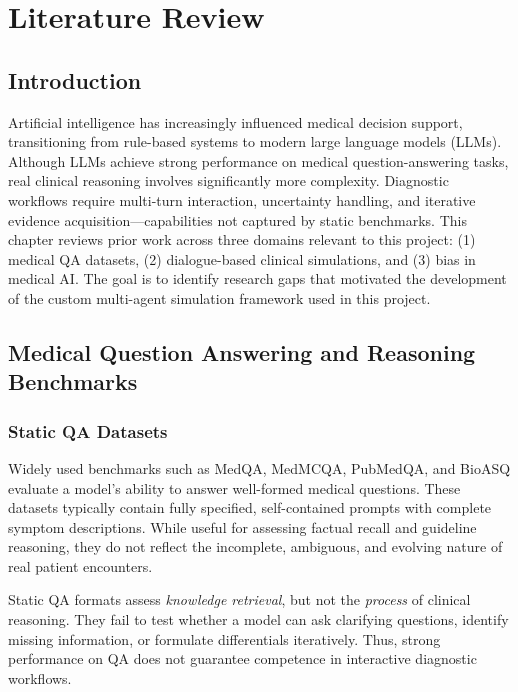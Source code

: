 
\chapter{Literature Review}

\label{Chapter 2} 


\section{Introduction}

Artificial intelligence has increasingly influenced medical decision support, transitioning from rule-based systems to modern large language models (LLMs). Although LLMs achieve strong performance on medical question-answering tasks, real clinical reasoning involves significantly more complexity. Diagnostic workflows require multi-turn interaction, uncertainty handling, and iterative evidence acquisition—capabilities not captured by static benchmarks.  
This chapter reviews prior work across three domains relevant to this project:  
(1) medical QA datasets,  
(2) dialogue-based clinical simulations, and  
(3) bias in medical AI.  
The goal is to identify research gaps that motivated the development of the custom multi-agent simulation framework used in this project.

\section{Medical Question Answering and Reasoning Benchmarks}

\subsection{Static QA Datasets}

Widely used benchmarks such as MedQA, MedMCQA, PubMedQA, and BioASQ evaluate a model’s ability to answer well-formed medical questions. These datasets typically contain fully specified, self-contained prompts with complete symptom descriptions. While useful for assessing factual recall and guideline reasoning, they do not reflect the incomplete, ambiguous, and evolving nature of real patient encounters.

Static QA formats assess \textit{knowledge retrieval}, but not the \textit{process} of clinical reasoning. They fail to test whether a model can ask clarifying questions, identify missing information, or formulate differentials iteratively. Thus, strong performance on QA does not guarantee competence in interactive diagnostic workflows.

